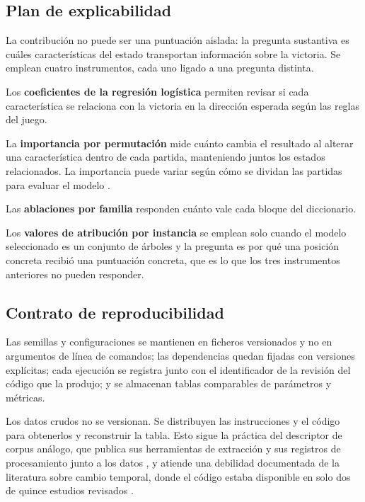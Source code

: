 \subsection{Plan de explicabilidad}
\label{subsec:explicabilidad}

La contribución no puede ser una puntuación aislada: la pregunta sustantiva
es cuáles características del estado transportan información sobre la
victoria. Se emplean cuatro instrumentos, cada uno ligado a una pregunta
distinta.

Los \textbf{coeficientes de la regresión logística} permiten revisar si
cada característica se relaciona con la victoria en la dirección esperada
según las reglas del juego.

La \textbf{importancia por permutación} mide cuánto cambia el resultado al
alterar una característica dentro de cada partida, manteniendo juntos los
estados relacionados. La importancia puede variar según cómo se dividan las
partidas para evaluar el modelo
\cite{karbalaie_participantaware_2026}.

Las \textbf{ablaciones por familia} responden cuánto vale cada bloque del
diccionario.

Los \textbf{valores de atribución por instancia} se emplean solo cuando el
modelo seleccionado es un conjunto de árboles y la pregunta es por qué una
posición concreta recibió una puntuación concreta, que es lo que los tres
instrumentos anteriores no pueden responder.

\subsection{Contrato de reproducibilidad}
\label{subsec:reproducibilidad}

Las semillas y configuraciones se mantienen en ficheros versionados y no en
argumentos de línea de comandos; las dependencias quedan fijadas con
versiones explícitas; cada ejecución se registra junto con el identificador
de la revisión del código que la produjo; y se almacenan tablas comparables
de parámetros y métricas.

Los datos crudos no se versionan. Se distribuyen las instrucciones y el
código para obtenerlos y reconstruir la tabla. Esto sigue la práctica del
descriptor de corpus análogo, que publica sus herramientas de extracción y
sus registros de procesamiento junto a los datos
\cite{bialecki_sc2egset_2023}, y atiende una debilidad documentada de la
literatura sobre cambio temporal, donde el código estaba disponible en solo
dos de quince estudios revisados \cite{guo_temporalshift_2021}.

